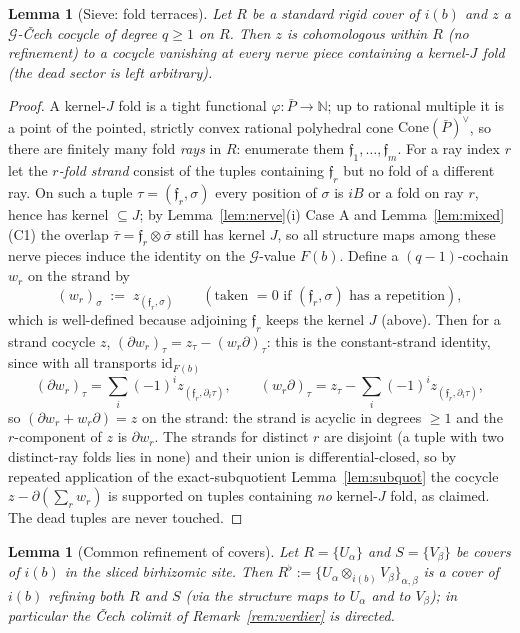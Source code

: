 \documentclass[11pt]{article}
\newtheorem{lemma}[theorem]{Lemma}
\theoremstyle{definition}
\newcommand{\Cone}{\mathrm{Cone}}
\begin{document}
\begin{lemma}[Sieve: fold terraces]\label{lem:sieve}
Let $R$ be a standard rigid cover of $i(b)$ and $z$ a $\mathcal
G$-\v{C}ech cocycle of degree $q\ge1$ on $R$. Then $z$ is
cohomologous within $R$ \textup{(}no refinement\textup{)} to a
cocycle vanishing at every nerve piece containing a kernel-$J$
fold \textup{(}the dead sector is left arbitrary\textup{)}.
\end{lemma}

\begin{proof}
A kernel-$J$ fold is a tight functional
$\varphi:\bar P\to\mathbb N$; up to rational multiple it is a
point of the pointed, strictly convex rational polyhedral cone
$\Cone(\bar P)^{\vee}$, so there are finitely many fold
\emph{rays} in $R$: enumerate them $\mathfrak f_1,\dots,\mathfrak
f_m$. For a ray index $r$ let the \emph{$r$-fold strand} consist
of the tuples containing $\mathfrak f_r$ but no fold of a
different ray. On such a tuple $\tau=(\mathfrak f_r,\sigma)$
every position of $\sigma$ is $iB$ or a fold on ray $r$, hence
has kernel $\subseteq J$; by Lemma~\ref{lem:nerve}(i) Case A and
Lemma~\ref{lem:mixed}(C1) the overlap
$\overline\tau=\mathfrak f_r\otimes\overline\sigma$ still has
kernel $J$, so all structure maps among these nerve pieces induce
the identity on the $\mathcal G$-value $F(b)$. Define a
$(q-1)$-cochain $w_r$ on the strand by
\[
(w_r)_\sigma\;:=\;z_{(\mathfrak f_r,\sigma)}\qquad
(\text{taken }=0\text{ if }(\mathfrak f_r,\sigma)\text{ has a
repetition}),
\]
which is well-defined because adjoining $\mathfrak f_r$ keeps the
kernel $J$ \textup{(}above\textup{)}. Then for a strand cocycle
$z$, $(\partial w_r)_\tau=z_\tau-(w_r\partial)_\tau$: this is the
constant-strand identity, since with all transports
$\mathrm{id}_{F(b)}$
\[
(\partial w_r)_\tau=\sum_i(-1)^i z_{(\mathfrak
f_r,\partial_i\tau)},\qquad
(w_r\partial)_\tau=z_\tau-\sum_i(-1)^i z_{(\mathfrak
f_r,\partial_i\tau)},
\]
so $(\partial w_r+w_r\partial)=z$ on the strand: the strand is
acyclic in degrees $\ge1$ and the $r$-component of $z$ is
$\partial w_r$. The strands for distinct $r$ are disjoint
\textup{(}a tuple with two distinct-ray folds lies in
none\textup{)} and their union is differential-closed, so by
repeated application of the exact-subquotient
Lemma~\ref{lem:subquot} the cocycle $z-\partial(\sum_r w_r)$ is
supported on tuples containing \emph{no} kernel-$J$ fold, as
claimed. The dead tuples are never touched.
\end{proof}
\begin{lemma}[Common refinement of covers]\label{lem:sandwich}
Let $R=\{U_\alpha\}$ and $S=\{V_\beta\}$ be covers of $i(b)$ in
the sliced birhizomic site. Then
$R^\flat:=\{U_\alpha\otimes_{i(b)}V_\beta\}_{\alpha,\beta}$ is a
cover of $i(b)$ refining both $R$ and $S$
\textup{(}via the structure maps to $U_\alpha$ and to
$V_\beta$\textup{)}; in particular the \v{C}ech colimit of
Remark~\ref{rem:verdier} is directed.
\end{lemma}
\end{document}
